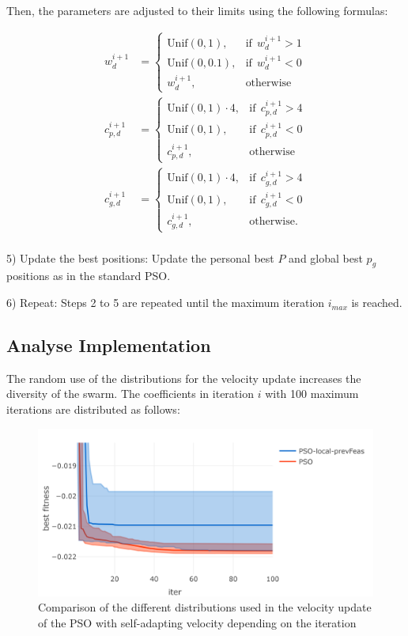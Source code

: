 \documentclass[
  oneside, a4paper, 12pt, openany]{book}
\theoremstyle{definition}
\theoremstyle{definition}
\theoremstyle{definition}
\theoremstyle{definition}
\theoremstyle{remark}
\begin{document}
Then, the parameters are adjusted to their limits using the following formulas:

\begin{align*}
w_d^{i+1} &= 
  \begin{cases}
    \text{Unif}(0,1), & \text{if}\ \ w_d^{i+1} > 1\\
    \text{Unif}(0,0.1), & \text{if}\ \  w_d^{i+1} < 0\\
    w_d^{i+1}, & \text{otherwise}
  \end{cases}\\
c_{p,d}^{i+1} &= 
  \begin{cases}
    \text{Unif}(0,1) \cdot 4, & \text{if}\ \ c_{p,d}^{i+1} > 4\\
    \text{Unif}(0,1), & \text{if}\ \  c_{p,d}^{i+1} < 0\\
    c_{p,d}^{i+1}, & \text{otherwise}
  \end{cases}\\
c_{g,d}^{i+1} &= 
  \begin{cases}
    \text{Unif}(0,1) \cdot 4, & \text{if}\ \ c_{g,d}^{i+1} > 4\\
    \text{Unif}(0,1), & \text{if}\ \  c_{g,d}^{i+1} < 0\\
    c_{g,d}^{i+1}, & \text{otherwise.}
  \end{cases}\\
\end{align*}

5) Update the best positions: Update the personal best \(P\) and global best \(p_g\) positions as in the standard PSO.

6) Repeat: Steps 2 to 5 are repeated until the maximum iteration \(i_{max}\) is reached.

\hypertarget{analyse-implementation}{%
\subsection{Analyse Implementation}\label{analyse-implementation}}

The random use of the distributions for the velocity update increases the diversity of the swarm. The coefficients in iteration \(i\) with 100 maximum iterations are distributed as follows:

\begin{figure}[H]
\includegraphics{Master_Thesis_files/figure-latex/unnamed-chunk-14-1} \caption{Comparison of the different distributions used in the velocity update of the PSO with self-adapting velocity depending on the iteration}\label{fig:unnamed-chunk-14}
\end{figure}
\end{document}

